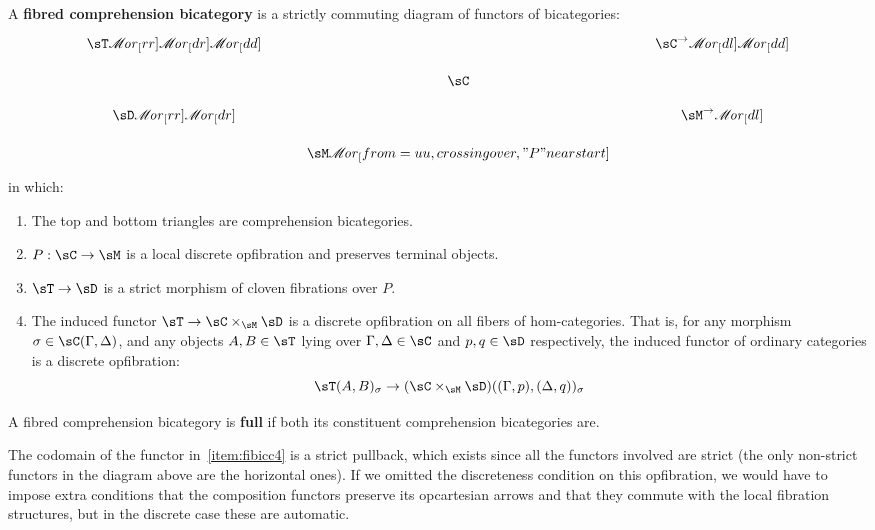 \documentclass{amsart}
\def\ar#1{\mathscr{M}\!\mathit{or}_{#1}}
\begin{document}
\begin{defn}\label{defn:fibicc}
  A \textbf{fibred comprehension bicategory} is a strictly commuting diagram of functors of bicategories:
  \[
  \begin{tikzcd}[row sep=small]
    \sT \ar[rr] \ar[dr] \ar[dd] && \sC^\to \ar[dl] \ar[dd] \\
    & \sC \\
    \sD \ar[rr] \ar[dr] && \sM^\to \ar[dl] \\
    & \sM \ar[from=uu,crossing over,"P" near start]
  \end{tikzcd}
  \]
  in which:
  \begin{enumerate}
  \item The top and bottom triangles are comprehension bicategories.
  \item $P:\sC\to\sM$ is a local discrete opfibration and preserves terminal objects.
  \item $\sT\to\sD$ is a strict morphism of cloven fibrations over $P$.
  \item The induced functor $\sT\to\sC\times_{\sM}\sD$ is a discrete opfibration on all fibers of hom-categories.
    That is, for any morphism $\sigma\in\sC(\Gamma,\Delta)$, and any objects $A,B\in\sT$ lying over $\Gamma,\Delta\in \sC$ and $p,q\in\sD$ respectively, the induced functor of ordinary categories is a discrete opfibration:\label{item:fibicc4}
    \[ \sT(A,B)_\sigma \to (\sC\times_{\sM}\sD)((\Gamma,p),(\Delta,q))_\sigma \]
  \end{enumerate}
  A fibred comprehension bicategory is \textbf{full} if both its constituent comprehension bicategories are.
\end{defn}

\begin{rmk}
The codomain of the functor in~\ref{item:fibicc4} is a strict pullback, which exists since all the functors involved are strict (the only non-strict functors in the diagram above are the horizontal ones).
If we omitted the discreteness condition on this opfibration, we would have to impose extra conditions that the composition functors preserve its opcartesian arrows and that they commute with the local fibration structures, but in the discrete case these are automatic.
\end{rmk}
\end{document}
